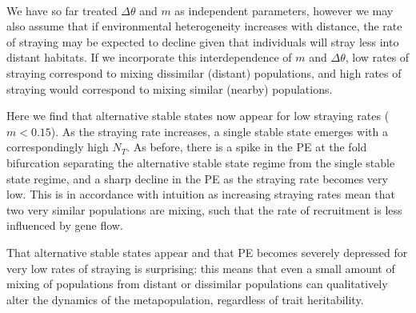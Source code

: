 \documentclass[twocolumn,preprintnumbers,amsmath,amssymb,superscriptaddress]{revtex4}
\begin{document}

\\ 
\noindent We have so far treated $\Delta\theta$ and $m$ as independent parameters, however we may also assume that if environmental heterogeneity increases with distance, the rate of straying may be expected to decline given that individuals will stray less into distant habitats. %
If we incorporate this interdependence of $m$ and $\Delta\theta$, low rates of straying correspond to mixing dissimilar (distant) populations, and high rates of straying would correspond to mixing similar (nearby) populations.

Here we find that alternative stable states now appear for low straying rates ($m<0.15$).
As the straying rate increases, a single stable state emerges with a correspondingly high $N_T$.
As before, there is a spike in the PE at the fold bifurcation separating the alternative stable state regime from the single stable state regime, and a sharp decline in the PE as the straying rate becomes very low.
This is in accordance with intuition as increasing straying rates mean that two very similar populations are mixing, such that the rate of recruitment is less influenced by gene flow.

That alternative stable states appear and that PE becomes severely depressed for very low rates of straying is surprising: this means that even a small amount of mixing of populations from distant or dissimilar populations can qualitatively alter the dynamics of the metapopulation, regardless of trait heritability.
\end{document}
